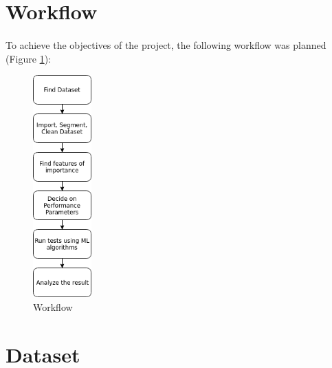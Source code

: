 \section{Workflow}
\paragraph{}
To achieve the objectives of the project, the following workflow was planned (Figure \ref{workflow}):
\begin{figure}[h]
    \hfill\includegraphics[width=0.2\textwidth]{Chapter3/workflow}\hspace*{\fill}
    \caption{Workflow}
    \label{workflow}
\end{figure}

\section{Dataset}
